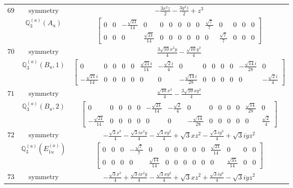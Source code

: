 \documentclass[fleqn,8pt,landscape]{jsarticle}
\begin{document}
\begin{longtable}{ccc}
$ 69 $ & $ \text{symmetry} $ & $ - \frac{3 x^{2} z}{2} - \frac{3 y^{2} z}{2} + z^{3} $ \\
$  $ & $ \mathbb{Q}_{3}^{(a)}(A_{u}) $ & $ \begin{bmatrix} 0 & 0 & - \frac{\sqrt{21}}{14} & 0 & 0 & 0 & 0 & 0 & 0 & \frac{\sqrt{7}}{7} & 0 & 0 & 0 & 0 \\ 0 & 0 & 0 & \frac{\sqrt{21}}{14} & 0 & 0 & 0 & 0 & 0 & 0 & \frac{\sqrt{7}}{7} & 0 & 0 & 0 \end{bmatrix} $ \\ \hline
$ 70 $ & $ \text{symmetry} $ & $ \frac{3 \sqrt{10} x^{2} y}{4} - \frac{\sqrt{10} y^{3}}{4} $ \\
$  $ & $ \mathbb{Q}_{3}^{(a)}(B_{u},1) $ & $ \begin{bmatrix} 0 & 0 & 0 & 0 & 0 & \frac{\sqrt{21} i}{14} & - \frac{\sqrt{2} i}{4} & 0 & 0 & 0 & 0 & 0 & - \frac{\sqrt{14} i}{28} & 0 \\ - \frac{\sqrt{21} i}{14} & 0 & 0 & 0 & 0 & 0 & 0 & - \frac{\sqrt{14} i}{28} & 0 & 0 & 0 & 0 & 0 & - \frac{\sqrt{2} i}{4} \end{bmatrix} $ \\ \hline
$ 71 $ & $ \text{symmetry} $ & $ \frac{\sqrt{10} x^{3}}{4} - \frac{3 \sqrt{10} x y^{2}}{4} $ \\
$  $ & $ \mathbb{Q}_{3}^{(a)}(B_{u},2) $ & $ \begin{bmatrix} 0 & 0 & 0 & 0 & 0 & - \frac{\sqrt{21}}{14} & - \frac{\sqrt{2}}{4} & 0 & 0 & 0 & 0 & 0 & \frac{\sqrt{14}}{28} & 0 \\ - \frac{\sqrt{21}}{14} & 0 & 0 & 0 & 0 & 0 & 0 & - \frac{\sqrt{14}}{28} & 0 & 0 & 0 & 0 & 0 & \frac{\sqrt{2}}{4} \end{bmatrix} $ \\ \hline
$ 72 $ & $ \text{symmetry} $ & $ - \frac{\sqrt{3} x^{3}}{4} - \frac{\sqrt{3} i x^{2} y}{4} - \frac{\sqrt{3} x y^{2}}{4} + \sqrt{3} x z^{2} - \frac{\sqrt{3} i y^{3}}{4} + \sqrt{3} i y z^{2} $ \\
$  $ & $ \mathbb{Q}_{3}^{(a)}(E_{1u}^{(a)}) $ & $ \begin{bmatrix} 0 & 0 & 0 & - \frac{\sqrt{7}}{7} & 0 & 0 & 0 & 0 & 0 & 0 & \frac{\sqrt{21}}{14} & 0 & 0 & 0 \\ 0 & 0 & 0 & 0 & \frac{\sqrt{14}}{14} & 0 & 0 & 0 & 0 & 0 & 0 & \frac{\sqrt{35}}{14} & 0 & 0 \end{bmatrix} $ \\ \hline
$ 73 $ & $ \text{symmetry} $ & $ - \frac{\sqrt{3} x^{3}}{4} + \frac{\sqrt{3} i x^{2} y}{4} - \frac{\sqrt{3} x y^{2}}{4} + \sqrt{3} x z^{2} + \frac{\sqrt{3} i y^{3}}{4} - \sqrt{3} i y z^{2} $ \\

\end{longtable}
\end{document}
